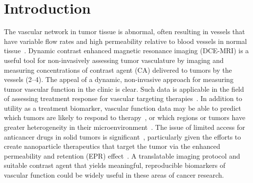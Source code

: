 \section{Introduction}

The vascular network in tumor tissue is abnormal, often resulting in vessels that have variable flow rates and high permeability relative to blood vessels in normal tissue~\cite{McDonald:2002ut}.
Dynamic contrast enhanced magnetic resonance imaging (DCE-MRI) is a useful tool for non-invasively assessing tumor vasculature by imaging and measuring concentrations of contrast agent (CA) delivered to tumors by the vessels (2–4).
The appeal of a dynamic, non-invasive approach for measuring tumor vascular function in the clinic is clear.
Such data is applicable in the field of assessing treatment response for vascular targeting therapies~\cite{OConnor:2012ie,Barrett:2006jx,Leach:2003fy}.
In addition to utility as a treatment biomarker, vascular function data may be able to predict which tumors are likely to respond to therapy~\cite{DeBruyne:2012cq,Kelly:2011cf,Bains:2009hh}, or which regions or tumors have greater heterogeneity in their microenvironment~\cite{OConnor:2011jm,Alic:2011hw}.
The issue of limited access for anticancer drugs in solid tumors is significant~\cite{Minchinton:2006gs}, particularly given the efforts to create nanoparticle therapeutics that target the tumor via the enhanced permeability and retention (EPR) effect~\cite{Jain:2001uf,Chauhan:2011fi}.
A translatable imaging protocol and suitable contrast agent that yields meaningful, reproducible biomarkers of vascular function could be widely useful in these areas of cancer research.

